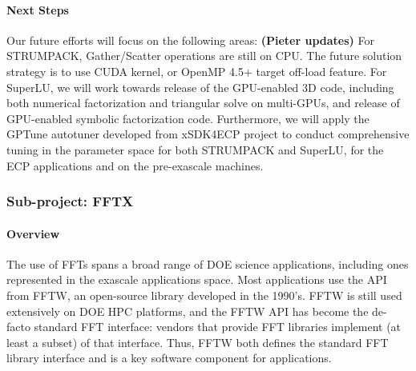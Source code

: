 \paragraph{Next Steps} Our future efforts will focus on the following areas:
 {\bf (Pieter updates)}
For STRUMPACK, Gather/Scatter operations are still on CPU. The future
 solution strategy is to use CUDA kernel, or OpenMP 4.5+ target off-load feature.
 For SuperLU, we will work towards release of the GPU-enabled 3D code, including both numerical
 factorization and triangular solve on multi-GPUs, and release of GPU-enabled symbolic
 factorization code.
 Furthermore, we will apply the GPTune autotuner developed from xSDK4ECP project to conduct comprehensive
 tuning in the parameter space for both STRUMPACK and SuperLU, for the ECP applications and
 on the pre-exascale machines.


\subsubsection{ Sub-project: FFTX} \label{subsubsect:fftx}
\noindent

\paragraph{Overview}
The use of FFTs spans a broad range of DOE science applications, including ones represented in the exascale applications space. Most applications use the API from FFTW, an open-source library developed in the 1990's. FFTW is still used extensively on DOE HPC platforms, and the FFTW API has become the de-facto
standard FFT interface: vendors that provide FFT libraries implement
(at least a subset) of that interface. Thus, FFTW both defines the 
standard FFT library interface and is a key software component
for applications.

